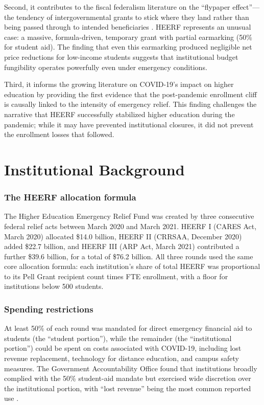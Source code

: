 \documentclass[12pt]{article}
\begin{document}
Second, it contributes to the fiscal federalism literature on the ``flypaper effect''---the tendency of intergovernmental grants to stick where they land rather than being passed through to intended beneficiaries \citep{hines1995, knight2002, gordon2004}. HEERF represents an unusual case: a massive, formula-driven, temporary grant with partial earmarking (50\% for student aid). The finding that even this earmarking produced negligible net price reductions for low-income students suggests that institutional budget fungibility operates powerfully even under emergency conditions.

Third, it informs the growing literature on COVID-19's impact on higher education \citep{deming2022, barr2022} by providing the first evidence that the post-pandemic enrollment cliff is causally linked to the intensity of emergency relief. This finding challenges the narrative that HEERF successfully stabilized higher education during the pandemic; while it may have prevented institutional closures, it did not prevent the enrollment losses that followed.

\section{Institutional Background}

\subsubsection*{The HEERF allocation formula} The Higher Education Emergency Relief Fund was created by three consecutive federal relief acts between March 2020 and March 2021. HEERF I (CARES Act, March 2020) allocated \$14.0 billion, HEERF II (CRRSAA, December 2020) added \$22.7 billion, and HEERF III (ARP Act, March 2021) contributed a further \$39.6 billion, for a total of \$76.2 billion. All three rounds used the same core allocation formula: each institution's share of total HEERF was proportional to its Pell Grant recipient count times FTE enrollment, with a floor for institutions below 500 students.

\subsubsection*{Spending restrictions} At least 50\% of each round was mandated for direct emergency financial aid to students (the ``student portion''), while the remainder (the ``institutional portion'') could be spent on costs associated with COVID-19, including lost revenue replacement, technology for distance education, and campus safety measures. The Government Accountability Office found that institutions broadly complied with the 50\% student-aid mandate but exercised wide discretion over the institutional portion, with ``lost revenue'' being the most common reported use \citep{gao2022}.
\end{document}
